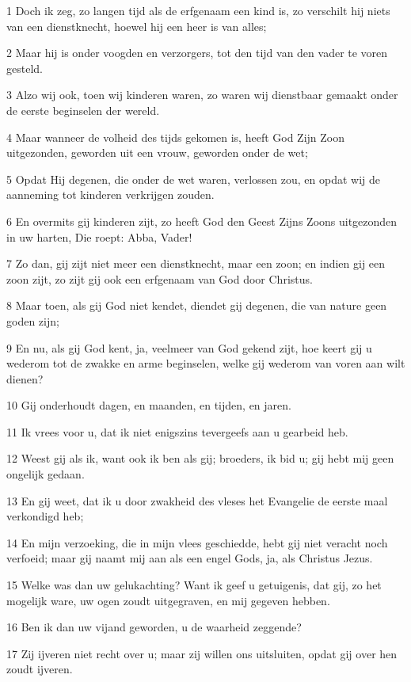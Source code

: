 \par 1 Doch ik zeg, zo langen tijd als de erfgenaam een kind is, zo verschilt hij niets van een dienstknecht, hoewel hij een heer is van alles;
\par 2 Maar hij is onder voogden en verzorgers, tot den tijd van den vader te voren gesteld.
\par 3 Alzo wij ook, toen wij kinderen waren, zo waren wij dienstbaar gemaakt onder de eerste beginselen der wereld.
\par 4 Maar wanneer de volheid des tijds gekomen is, heeft God Zijn Zoon uitgezonden, geworden uit een vrouw, geworden onder de wet;
\par 5 Opdat Hij degenen, die onder de wet waren, verlossen zou, en opdat wij de aanneming tot kinderen verkrijgen zouden.
\par 6 En overmits gij kinderen zijt, zo heeft God den Geest Zijns Zoons uitgezonden in uw harten, Die roept: Abba, Vader!
\par 7 Zo dan, gij zijt niet meer een dienstknecht, maar een zoon; en indien gij een zoon zijt, zo zijt gij ook een erfgenaam van God door Christus.
\par 8 Maar toen, als gij God niet kendet, diendet gij degenen, die van nature geen goden zijn;
\par 9 En nu, als gij God kent, ja, veelmeer van God gekend zijt, hoe keert gij u wederom tot de zwakke en arme beginselen, welke gij wederom van voren aan wilt dienen?
\par 10 Gij onderhoudt dagen, en maanden, en tijden, en jaren.
\par 11 Ik vrees voor u, dat ik niet enigszins tevergeefs aan u gearbeid heb.
\par 12 Weest gij als ik, want ook ik ben als gij; broeders, ik bid u; gij hebt mij geen ongelijk gedaan.
\par 13 En gij weet, dat ik u door zwakheid des vleses het Evangelie de eerste maal verkondigd heb;
\par 14 En mijn verzoeking, die in mijn vlees geschiedde, hebt gij niet veracht noch verfoeid; maar gij naamt mij aan als een engel Gods, ja, als Christus Jezus.
\par 15 Welke was dan uw gelukachting? Want ik geef u getuigenis, dat gij, zo het mogelijk ware, uw ogen zoudt uitgegraven, en mij gegeven hebben.
\par 16 Ben ik dan uw vijand geworden, u de waarheid zeggende?
\par 17 Zij ijveren niet recht over u; maar zij willen ons uitsluiten, opdat gij over hen zoudt ijveren.
